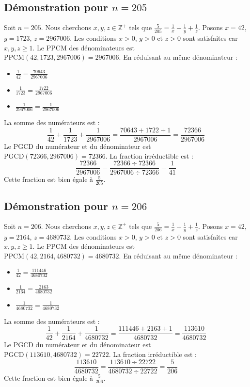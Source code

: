 \documentclass[11pt,a4paper]{article}
\begin{document}
\subsection{Démonstration pour $n = 205$}
Soit $n = 205$. Nous cherchons $x, y, z \in \mathbb{Z}^{+}$ tels que $\frac{5}{205} = \frac{1}{x} + \frac{1}{y} + \frac{1}{z}$.
Posons $x = 42$, $y = 1723$, $z = 2967006$.
Les conditions $x > 0$, $y > 0$ et $z > 0$ sont satisfaites car $x, y, z \geq 1$.
Le PPCM des dénominateurs est $\text{PPCM}(42, 1723, 2967006) = 2967006$.
En réduisant au même dénominateur :
\begin{itemize}
    \item $\frac{1}{42} = \frac{70643}{2967006}$
    \item $\frac{1}{1723} = \frac{1722}{2967006}$
    \item $\frac{1}{2967006} = \frac{1}{2967006}$
\end{itemize}
La somme des numérateurs est :
$$ \frac{1}{42} + \frac{1}{1723} + \frac{1}{2967006} = \frac{70643 + 1722 + 1}{2967006} = \frac{72366}{2967006} $$
Le PGCD du numérateur et du dénominateur est $\text{PGCD}(72366, 2967006) = 72366$.
La fraction irréductible est :
$$ \frac{72366}{2967006} = \frac{72366 \div 72366}{2967006 \div 72366} = \frac{1}{41} $$
Cette fraction est bien égale à $\frac{5}{205}$.

\subsection{Démonstration pour $n = 206$}
Soit $n = 206$. Nous cherchons $x, y, z \in \mathbb{Z}^{+}$ tels que $\frac{5}{206} = \frac{1}{x} + \frac{1}{y} + \frac{1}{z}$.
Posons $x = 42$, $y = 2164$, $z = 4680732$.
Les conditions $x > 0$, $y > 0$ et $z > 0$ sont satisfaites car $x, y, z \geq 1$.
Le PPCM des dénominateurs est $\text{PPCM}(42, 2164, 4680732) = 4680732$.
En réduisant au même dénominateur :
\begin{itemize}
    \item $\frac{1}{42} = \frac{111446}{4680732}$
    \item $\frac{1}{2164} = \frac{2163}{4680732}$
    \item $\frac{1}{4680732} = \frac{1}{4680732}$
\end{itemize}
La somme des numérateurs est :
$$ \frac{1}{42} + \frac{1}{2164} + \frac{1}{4680732} = \frac{111446 + 2163 + 1}{4680732} = \frac{113610}{4680732} $$
Le PGCD du numérateur et du dénominateur est $\text{PGCD}(113610, 4680732) = 22722$.
La fraction irréductible est :
$$ \frac{113610}{4680732} = \frac{113610 \div 22722}{4680732 \div 22722} = \frac{5}{206} $$
Cette fraction est bien égale à $\frac{5}{206}$.
\end{document}
